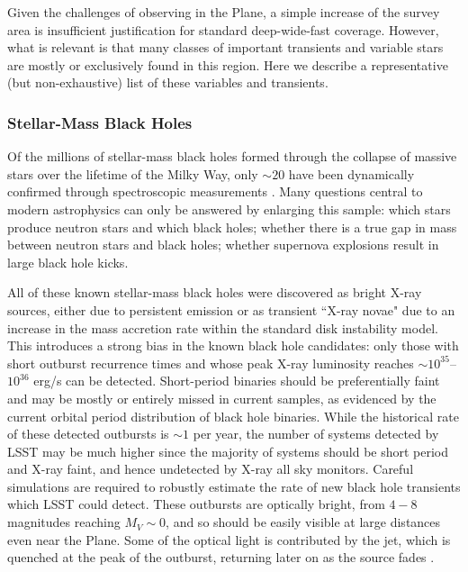 Given the challenges of observing in the Plane, a simple increase of the survey area is insufficient justification for standard deep-wide-fast coverage. 
However, what is relevant is that many classes of important transients and variable stars are mostly or exclusively found in this region. Here we describe a 
representative (but non-exhaustive) list of these variables and transients.


\subsubsection{Stellar-Mass Black Holes}

Of the millions of stellar-mass black holes formed through the collapse of massive stars over the lifetime of the Milky Way, only $\sim 20$ have been 
dynamically confirmed through spectroscopic measurements
\citep[e.g.,][]{2015arXiv151008869C}.  Many questions central to modern
astrophysics can only be answered by enlarging this sample: which stars produce
neutron stars and which black holes; whether there is a true gap in mass
between neutron stars and black holes; whether supernova explosions result in
large black hole kicks.

All of these known stellar-mass black holes were discovered  as bright X-ray sources, either due to persistent emission or as transient ``X-ray novae" 
due to an increase in the mass accretion rate within the standard  disk instability model. This introduces a strong bias in the known black hole candidates:
only those with short outburst recurrence times and whose peak X-ray luminosity reaches $\sim 10^{35}$--$10^{36}$ erg/s can be detected. 
Short-period binaries should be preferentially faint
\citep{2014MNRAS.437.3087K} and may be mostly or entirely missed in current
samples, as evidenced by the current orbital period distribution of black hole
binaries. While the historical rate of these detected outbursts is $\sim 1$ per
year, the number of systems detected by LSST may be much higher since the
majority of systems should be short period and X-ray faint, and hence
undetected by X-ray all sky monitors. Careful simulations are required to
robustly estimate the rate of new black hole transients which LSST could
detect.  These outbursts are optically bright, from $4-8$ magnitudes reaching
$M_{V}\sim 0$, and so should be easily visible at large distances even near the
Plane. Some of the optical light is contributed by the jet, which is quenched
at the peak of the outburst, returning later on as the source fades
\citep{2001ApJ...554L.181J}.

